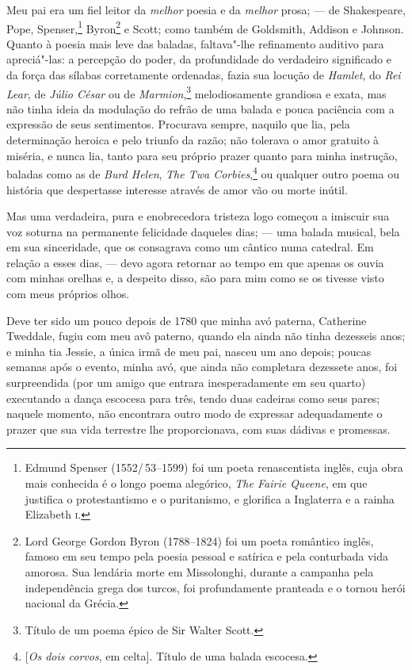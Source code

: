 Meu pai era um fiel leitor da \textit{melhor} poesia e da \textit{melhor}
prosa; --- de Shakespeare, Pope, Spenser,\footnote{Edmund Spenser (1552/\,53--1599) foi um poeta renascentista inglês, cuja obra mais conhecida é o
  longo poema alegórico, \textit{The Fairie Queene}, em que justifica o
  protestantismo e o puritanismo, e glorifica a Inglaterra e a rainha
  Elizabeth \textsc{i}.} Byron\footnote{Lord George Gordon Byron
  (1788--1824) foi um poeta romântico inglês, famoso em seu tempo pela
  poesia pessoal e satírica e pela conturbada vida amorosa. Sua lendária
  morte em Missolonghi, durante a campanha pela independência grega dos
  turcos, foi profundamente pranteada e o tornou herói nacional da
  Grécia.} e Scott; como também de Goldsmith, Addison e
Johnson. Quanto à poesia mais leve das baladas, faltava"-lhe refinamento
auditivo para apreciá"-las: a percepção do poder, da profundidade do
verdadeiro significado e da força das sílabas corretamente ordenadas,
fazia sua locução de \textit{Hamlet}, do \textit{Rei Lear}, de \textit{Júlio
César} ou de \textit{Marmion},\footnote{Título de um poema épico de Sir
  Walter Scott.} melodiosamente grandiosa e exata, mas
não tinha ideia da modulação do refrão de uma balada e pouca paciência
com a expressão de seus sentimentos. Procurava sempre, naquilo que lia,
pela determinação heroica e pelo triunfo da razão; não tolerava o amor
gratuito à miséria, e nunca lia, tanto para seu próprio prazer quanto
para minha instrução, baladas como as de \textit{Burd Helen}, \textit{The
Twa Corbies},\footnote{{[}\textit{Os dois corvos}, em celta{]}. Título de uma
  balada escocesa.} ou qualquer outro poema ou história
que despertasse interesse através de amor vão ou morte inútil.

Mas uma verdadeira, pura e enobrecedora tristeza logo começou a imiscuir
sua voz soturna na permanente felicidade daqueles dias; --- uma balada
musical, bela em sua sinceridade, que os consagrava como um cântico numa
catedral. Em relação a esses dias, --- devo agora retornar ao tempo em
que apenas os ouvia com minhas orelhas e, a despeito disso, são para mim
como se os tivesse visto com meus próprios olhos.

Deve ter sido um pouco depois de 1780 que minha avó paterna,
Catherine Tweddale, fugiu com meu avô paterno, quando ela ainda não
tinha dezesseis anos; e minha tia Jessie, a única irmã de meu pai,
nasceu um ano depois; poucas semanas após o evento, minha avó, que ainda
não completara dezessete anos, foi surpreendida (por um amigo que
entrara inesperadamente em seu quarto) executando a dança escocesa para
três, tendo duas cadeiras como seus pares; naquele momento, não
encontrara outro modo de expressar adequadamente o prazer que sua vida
terrestre lhe proporcionava, com suas dádivas e promessas.

